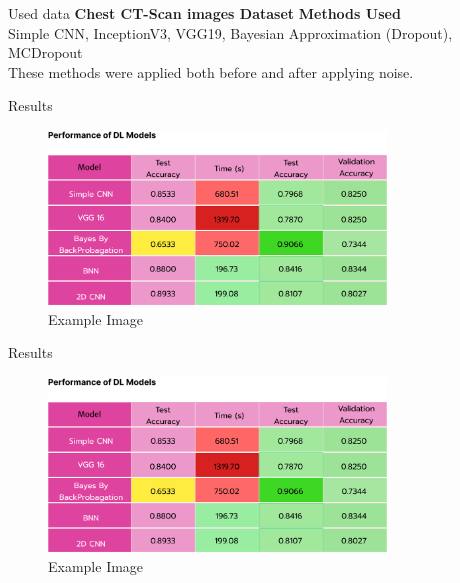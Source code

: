 \documentclass[aspectratio=169,xcolor=dvipsnames, t]{beamer}
\begin{document}
\begin{frame}{Used data}
\textbf{Chest CT-Scan images Dataset}
 \textbf{Methods Used} \\
    Simple CNN, InceptionV3, VGG19, Bayesian Approximation (Dropout), MCDropout \\
    \vspace{0.5em}
    These methods were applied both before and after applying noise.
\end{frame}

\begin{frame}{Results}
   \begin{figure}[h]
    \centering
    \includegraphics[width=0.8\textwidth]{images/table1.png}
    \caption{Example Image}
    \label{fig:example}
\end{figure}

\end{frame}


\begin{frame}{Results}
   \begin{figure}[h]
    \centering
    \includegraphics[width=0.8\textwidth]{images/table1.png}
    \caption{Example Image}
    \label{fig:example}
\end{figure}

\end{frame}



\end{document}
